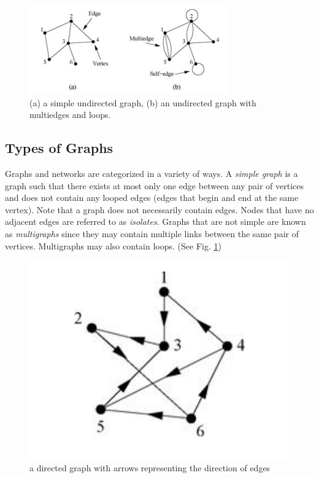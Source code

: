 \documentclass{article}
\begin{document}
\begin{figure}[h]
    \center
    \includegraphics[scale=1.0]{newman-graphs}
    \caption{(a) a simple undirected graph, (b) an undirected graph with multiedges and loops.   \cite{newman}}
    \label{fig:graph}
\end{figure}


\subsection{Types of Graphs}
Graphs and networks are categorized in a variety of ways. A \textit{simple graph} is a graph such that there exists at most only one edge between any pair of vertices and does not contain any looped edges (edges that begin and end at the same vertex).  Note that a graph does not necessarily contain edges. Nodes that have no adjacent edges are referred to as \textit{isolates}.  Graphs that are not simple are known as \textit{multigraphs} since they may contain multiple links between the same pair of vertices.  Multigraphs may also contain loops. (See Fig. \ref{fig:graph})

\begin{figure}[h]
    \center
    \includegraphics[scale=0.6]{newman-directed}
    \caption{a directed graph with arrows representing the direction of edges  \cite{newman}}
    \label{fig:digraph}
\end{figure}
\end{document}
